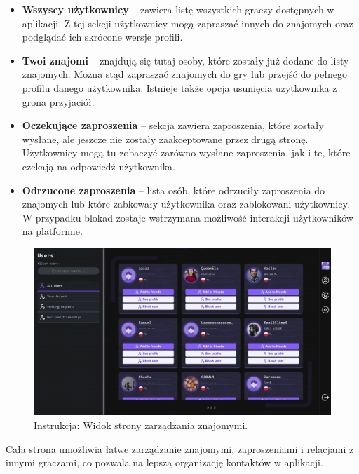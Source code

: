 \documentclass[12pt,a4paper]{article}
\begin{document}
\begin{itemize}
    \item \textbf{Wszyscy użytkownicy} – zawiera listę wszystkich graczy dostępnych w aplikacji. Z tej sekcji użytkownicy mogą zapraszać innych do znajomych oraz podglądać ich skrócone wersje profili.
    \item \textbf{Twoi znajomi} – znajdują się tutaj osoby, które zostały już dodane do listy znajomych. Można stąd zapraszać znajomych do gry lub przejść do pełnego profilu danego użytkownika. Istnieje także opcja usunięcia uzytkownika z grona przyjaciół.
    \item \textbf{Oczekujące zaproszenia} – sekcja zawiera zaproszenia, które zostały wysłane, ale jeszcze nie zostały zaakceptowane przez drugą stronę. Użytkownicy mogą tu zobaczyć zarówno wysłane zaproszenia, jak i te, które czekają na odpowiedź użytkownika.
    \item \textbf{Odrzucone zaproszenia} – lista osób, które odrzuciły zaproszenia do znajomych lub które zabkowały użytkownika oraz zablokowani użytkownicy. W przypadku blokad zostaje wstrzymana możliwość interakcji użytkowników na platformie.
\end{itemize}



\vspace{0.5cm}
\begin{figure}[h!]
    \centering
    \includegraphics[width=1\textwidth]{images/ins_users.png}
    \caption{Instrukcja: Widok strony zarządzania znajomymi.}
\end{figure}
\vspace{0.5cm}

\noindent
Cała strona umożliwia łatwe zarządzanie znajomymi, zaproszeniami i relacjami z innymi graczami, co pozwala na lepszą organizację kontaktów w aplikacji.
\end{document}
